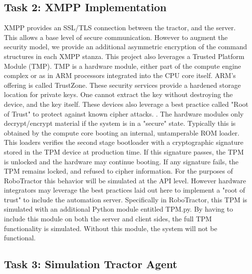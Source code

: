 \documentclass[conference,12pt]{IEEEtran}
\begin{document}
\subsection{Task 2: XMPP Implementation}
\label{sec:xmpp}
XMPP provides an SSL/TLS connection between the tractor, and the server. This
allows a base level of secure communication.  However to augment the security
model, we provide an additional asymmetric encryption of the command structures
in each XMPP stanza. This project also leverages a Trusted Platform
Module (TMP). TMP is a hardware module, either part of the compute engine
complex or as in ARM processors integrated into the CPU core itself.  ARM's
offering is called TrustZone.  These security services provide a hardened
storage location for private keys.  One cannot extract the key without
destroying the device, and the key itself.  These devices also leverage a best
practice called "Root of Trust" to protect against known cipher attacks.
\autocite{_tpm_2013}.  The hardware modules only decrypt/encrypt material if the system is in a "secure" state.  Typically this is obtained by the compute core booting an internal,
untamperable ROM loader.  This loaders verifies the second stage bootloader with
a cryptographic signature stored in the TPM device at production time. If this
signature passes, the TPM is unlocked and the hardware may continue booting. If
any signature fails, the TPM remains locked, and refused to cipher information.
For the purposes of RoboTractor this behavior will be simulated at the API
level.  However hardware integrators may leverage the best practices laid out
here to implement a "root of trust" to include the automation server. Specifically in RoboTractor, this TPM is simulated with an additional Python module entitled TPM.py. By having to include this module on both the server and client sides, the full TPM functionality is simulated. Without this module, the system will not be functional.

\subsection{Task 3: Simulation Tractor Agent}
\end{document}
